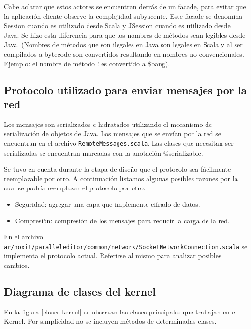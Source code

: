 \documentclass[12pt,a4paper]{article}
\begin{document}
Cabe aclarar que estos actores se encuentran detrás de un facade, para evitar que la aplicación cliente observe la
complejidad subyacente. Este facade se denomina Session cuando es utilizado desde Scala y JSession cuando es utilizado desde Java.
Se hizo esta diferencia para que los nombres de métodos sean legibles desde Java. (Nombres de métodos que son ilegales en Java son
legales en Scala y al ser compilados a bytecode son convertidos resultando en nombres no convencionales. Ejemplo: el nombre de 
método ! es convertido a \$bang).


\subsection{Protocolo utilizado para enviar mensajes por la red}
Los mensajes son serializados e hidratados utilizando el mecanismo de serialización de objetos de Java. Los mensajes que se
envían por la red se encuentran en el archivo
\texttt{RemoteMessages.scala}.
Las clases que necesitan ser serializadas se encuentran marcadas con la anotación @serializable.

Se tuvo en cuenta durante la etapa de diseño que el protocolo sea fácilmente reemplazable por otro. A continuación listamos
algunas posibles razones por la cual se podría reemplazar el protocolo por otro:

\begin{itemize}
	\item Seguridad: agregar una capa que implemente cifrado de datos.
	\item Compresión: compresión de los mensajes para reducir la carga de la red.
\end{itemize}

En el archivo \texttt{ar/noxit/paralleleditor/common/network/SocketNetworkConnection.scala} se implementa
 el protocolo actual. Referirse al mismo para analizar posibles cambios.

\subsection{Diagrama de clases del kernel}
En la figura \ref{clases-kernel} se observan las clases principales que trabajan en el Kernel. Por simplicidad no se 
incluyen métodos de determinadas clases.
\end{document}
